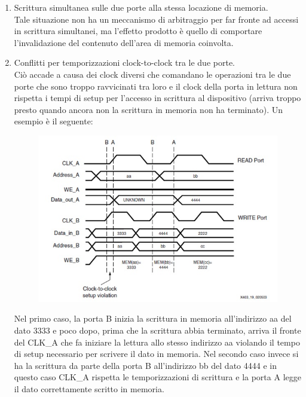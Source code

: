 \begin{enumerate}
	\item Scrittura simultanea sulle due porte alla stessa locazione di memoria.\\
	Tale situazione non ha un meccanismo di arbitraggio per far fronte ad accessi in scrittura simultanei, ma l'effetto prodotto è quello di comportare l'invalidazione del contenuto dell'area di memoria coinvolta.
	\item Conflitti per temporizzazioni clock-to-clock tra le due porte.\\
Ci\`o accade a causa dei clock diversi che comandano le operazioni tra le due porte che sono troppo ravvicinati tra loro e il clock della porta in lettura non rispetta i tempi di setup per l'accesso in scrittura al dispositivo (arriva troppo presto quando ancora non la scrittura in memoria non ha terminato). Un esempio \`e il seguente:

\begin{figure}[!h]
\centering
\includegraphics[width=\textwidth]{img/blockRam/conflittiTemp.jpg}
\label{fig:set_ass}
\end{figure} 

Nel primo caso, la porta B inizia la scrittura in memoria all'indirizzo aa del dato 3333 e poco dopo, prima che la scrittura abbia terminato, arriva il fronte del CLK\_A che fa iniziare la lettura allo stesso indirizzo aa violando il tempo di setup necessario per scrivere il dato in memoria. Nel secondo caso invece si ha la scrittura da parte della porta B all'indirizzo bb del dato 4444 e in questo caso CLK\_A rispetta le temporizzazioni di scrittura e la porta A legge il dato correttamente scritto in memoria.


\end{enumerate}
